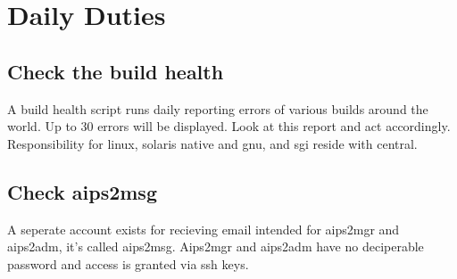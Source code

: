 \chapter{Daily Duties}
\section{Check the build health}
A build health script runs daily reporting errors of various builds around the world.  Up to 30
errors will be displayed. Look at this report and act accordingly.  Responsibility for linux, solaris native and gnu, and sgi reside with \aipspp central.
\section{Check aips2msg}
A seperate account exists for recieving email intended for aips2mgr and aips2adm, it's called
aips2msg.  Aips2mgr and
aips2adm have no deciperable password and access is granted via ssh keys.
